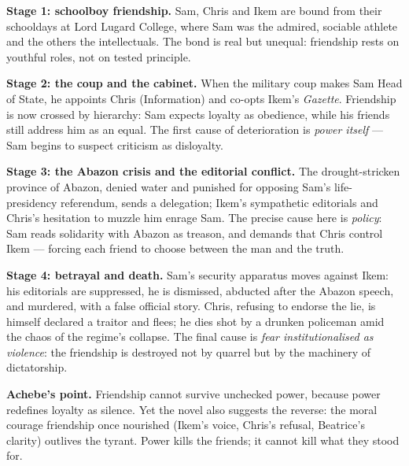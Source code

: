\documentclass[11pt]{article}
\begin{document}
\begin{corrige}
\textbf{Stage 1: schoolboy friendship.} Sam, Chris and Ikem are bound from their schooldays at Lord Lugard College, where Sam was the admired, sociable athlete and the others the intellectuals. The bond is real but unequal: friendship rests on youthful roles, not on tested principle.

\textbf{Stage 2: the coup and the cabinet.} When the military coup makes Sam Head of State, he appoints Chris (Information) and co-opts Ikem's \emph{Gazette}. Friendship is now crossed by hierarchy: Sam expects loyalty as obedience, while his friends still address him as an equal. The first cause of deterioration is \emph{power itself} --- Sam begins to suspect criticism as disloyalty.

\textbf{Stage 3: the Abazon crisis and the editorial conflict.} The drought-stricken province of Abazon, denied water and punished for opposing Sam's life-presidency referendum, sends a delegation; Ikem's sympathetic editorials and Chris's hesitation to muzzle him enrage Sam. The precise cause here is \emph{policy}: Sam reads solidarity with Abazon as treason, and demands that Chris control Ikem --- forcing each friend to choose between the man and the truth.

\textbf{Stage 4: betrayal and death.} Sam's security apparatus moves against Ikem: his editorials are suppressed, he is dismissed, abducted after the Abazon speech, and murdered, with a false official story. Chris, refusing to endorse the lie, is himself declared a traitor and flees; he dies shot by a drunken policeman amid the chaos of the regime's collapse. The final cause is \emph{fear institutionalised as violence}: the friendship is destroyed not by quarrel but by the machinery of dictatorship.

\textbf{Achebe's point.} Friendship cannot survive unchecked power, because power redefines loyalty as silence. Yet the novel also suggests the reverse: the moral courage friendship once nourished (Ikem's voice, Chris's refusal, Beatrice's clarity) outlives the tyrant. Power kills the friends; it cannot kill what they stood for.
\end{corrige}
\end{document}
